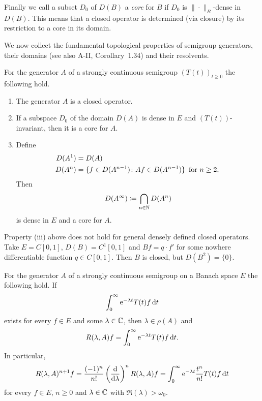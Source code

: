 Finally we call a subset $D_{0}$ of $D(B)$ a \emph{core} for $B$ if $D_{0}$ is $\|\cdot\|_{B}$-dense in $D(B)$.
This means that a closed operator is determined (via closure) by its restriction to a core in its domain.

We now collect the fundamental topological properties of semigroup generators, their domains (see also A-II, Corollary~1.34) and their resolvents.
\begin{proposition}\label{prop:a1-1.9}
For the generator $A$ of a strongly continuous semigroup $(T(t))_{t \geq 0}$ the following hold.
\begin{enumerate}[\upshape(i)]
\item 
The generator $A$ is a closed operator.

\item
If a subspace $D_{0}$ of the domain $D(A)$ is dense in $E$ and $(T(t))$-invariant, then it is a core for $A$.
\item Define 
%
\begin{align*}
	D(A^{1}) &= D(A) \\
	D(A^{n}) &= \{f \in D(A^{n-1}) \colon Af \in D(A^{n-1})\} \, \text{ for $ n \geq 2 $, }
\end{align*}
%
Then %
\[
	D(A^{\infty}) \coloneqq \bigcap_{n \in \mathbb{N}} D(A^{n})
\]
%
is dense in $E$ and a core for $A$.
\end{enumerate}
\end{proposition}
\begin{example}\label{ex:a1-1.10}
Property (iii) above does not hold for general densely defined closed operators.
Take $E = C\left[ 0,1 \right]$, $D(B) = C^{1}\left[ 0,1 \right]$ and $Bf = q \cdot f'$ for some nowhere differentiable function $q \in C\left[ 0,1 \right]$.
Then $B$ is closed, but $D(B^{2}) = \{0\}$.
\end{example}
\begin{proposition}\label{prop:a1-1.11}
For the generator $A$ of a strongly continuous semigroup on a Banach space $E$ the following hold.
If %
\[
	 \int_{0}^{\infty}  \mathrm{e}^{-\lambda t}T(t)f \mathop{}\!\mathrm{d}{t} 
\]
%
exists for every $f \in E$ and some $\lambda \in \mathbb{C}$, then $\lambda \in \rho(A)$ and 
%
\[
	R(\lambda,A)f = \int_{0}^{\infty}  \mathrm{e}^{-\lambda t}T(t)f  \mathop{}\!\mathrm{d}{t}.
\]
%
In particular,
\begin{equation}\label{eq:a1-1.7}
R(\lambda,A)^{n+1}f 
	= \frac{(-1)^{n}}{n!}\left(\frac{\mathop{}\!\mathrm{d}{ }}{\mathop{}\!\mathrm{d}{\lambda}}\right)^{n} R(\lambda,A)f 
	= \int_{0}^{\infty}  \mathrm{e}^{-\lambda t}\frac{t^{n}}{n!}T(t)f  \mathop{}\!\mathrm{d}{t}
\end{equation}
for every $f \in E$, $n \geq 0$ and $\lambda \in \mathbb{C}$ with $\Re(\lambda) > \omega_{0}$.
\end{proposition}
